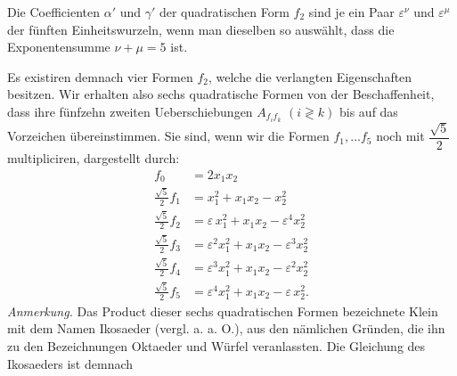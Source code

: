 \documentclass[11pt]{article}
\begin{document}
\glqq Die Coefficienten $\alpha'$ und $\gamma'$ der quadratischen Form $f_2$ sind je ein Paar $\varepsilon^\nu$ und $\varepsilon^\mu$ der fünften Einheitswurzeln, wenn man dieselben so auswählt, dass die Exponentensumme $\nu+\mu=5$ ist.\grqq{}

Es existiren demnach vier Formen $f_2$, welche die verlangten Eigenschaften besitzen. Wir erhalten also sechs quadratische Formen von der Beschaffenheit, dass ihre fünfzehn zweiten Ueberschiebungen $A_{f_if_k}$ $(i\gtrless k)$ bis auf das Vorzeichen übereinstimmen. Sie sind, wenn wir die Formen $f_1,\dots f_5$ noch mit $\dfrac{\sqrt5}{2}$ multipliciren, dargestellt durch:
\[
\begin{aligned}
f_0 &= 2x_1x_2 \\
\frac{\sqrt5}{2}f_1 &= x_1^2 + x_1x_2 - x_2^2 \\
\frac{\sqrt5}{2}f_2 &= \varepsilon\,x_1^2 + x_1x_2 - \varepsilon^4 x_2^2 \\
\frac{\sqrt5}{2}f_3 &= \varepsilon^2 x_1^2 + x_1x_2 - \varepsilon^3 x_2^2 \\
\frac{\sqrt5}{2}f_4 &= \varepsilon^3 x_1^2 + x_1x_2 - \varepsilon^2 x_2^2 \\
\frac{\sqrt5}{2}f_5 &= \varepsilon^4 x_1^2 + x_1x_2 - \varepsilon\, x_2^2.
\end{aligned}
\]
\textit{Anmerkung.} Das Product dieser sechs quadratischen Formen bezeichnete Klein mit dem Namen \glqq Ikosaeder\grqq{} (vergl. a. a. O.), aus den nämlichen Gründen, die ihn zu den Bezeichnungen \glqq Oktaeder\grqq{} und \glqq Würfel\grqq{} veranlassten. Die Gleichung des Ikosaeders ist demnach
\end{document}
